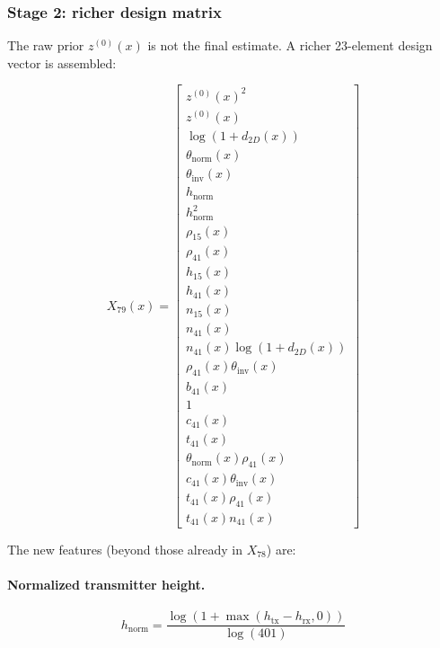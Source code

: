 \documentclass[11pt,a4paper]{article}
\begin{document}
\subsubsection{Stage 2: richer design matrix}

The raw prior $z^{(0)}(x)$ is not the final estimate. A richer 23-element
design vector is assembled:

\begin{equation}
X_{79}(x)
=
\begin{bmatrix}
z^{(0)}(x)^2 \\
z^{(0)}(x) \\
\log(1+d_{2D}(x)) \\
\theta_{\mathrm{norm}}(x) \\
\theta_{\mathrm{inv}}(x) \\
h_{\mathrm{norm}} \\
h_{\mathrm{norm}}^2 \\
\rho_{15}(x) \\
\rho_{41}(x) \\
h_{15}(x) \\
h_{41}(x) \\
n_{15}(x) \\
n_{41}(x) \\
n_{41}(x)\log(1+d_{2D}(x)) \\
\rho_{41}(x)\theta_{\mathrm{inv}}(x) \\
b_{41}(x) \\
1 \\
c_{41}(x) \\
t_{41}(x) \\
\theta_{\mathrm{norm}}(x)\rho_{41}(x) \\
c_{41}(x)\theta_{\mathrm{inv}}(x) \\
t_{41}(x)\rho_{41}(x) \\
t_{41}(x)n_{41}(x)
\end{bmatrix}
\label{eq:x79}
\end{equation}

The new features (beyond those already in $X_{78}$) are:

\paragraph{Normalized transmitter height.}

\begin{equation}
h_{\mathrm{norm}}=
\frac{\log\!\left(1+\max(h_{\mathrm{tx}}-h_{\mathrm{rx}},0)\right)}
{\log(401)}
\label{eq:hnorm}
\end{equation}
\end{document}
